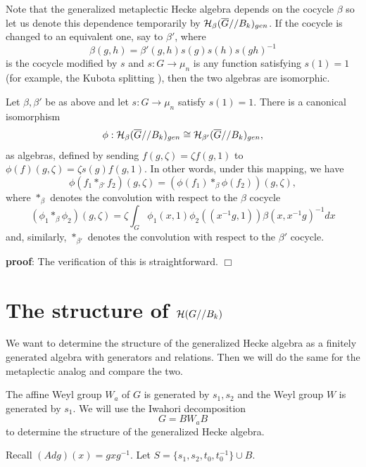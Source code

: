 Note that the generalized metaplectic Hecke
algebra depends on the cocycle $\beta$
so let us denote this dependence temporarily by
${\cal H}_\beta(\overline{G}//B_k)_{gen}$.
If the cocycle is changed to an equivalent one,
say to $\beta'$, where 
\[
\beta(g,h)=\beta'(g,h)s(g)s(h)s(gh)^{-1}
\]
is the cocycle modified by $s$ 
and $s:G\rightarrow \mu_n$ is any function
satisfying $s(1)=1$
(for example, the Kubota splitting
\cite{KP}), then the two algebras are 
isomorphic.

\begin{lemma} 
\label{lemma:isomorphic}
Let $\beta,\beta'$ be as above and let
$s:G\rightarrow \mu_n$ satisfy $s(1)=1$.
There is a canonical isomorphism
\[
\phi:{\cal H}_\beta(\overline{G}//B_k)_{gen}
\cong
{\cal H}_{\beta'}(\overline{G}//B_k)_{gen},
\]
as algebras, defined by sending $f(g,\zeta)=\zeta f(g,1)$ to
$\phi(f)(g,\zeta)=\zeta s(g) f(g,1)$. In other words,
under this mapping, we have
\[
\phi(f_1*_{\beta'} f_2)(g,\zeta)
=(\phi(f_1)*_{\beta}\phi(f_2))(g,\zeta),
\]
where $*_\beta$ denotes the convolution
with respect to the $\beta$ cocycle
\[
(\phi_1*_\beta \phi_2)(g,\zeta)
=\zeta \int_{G}\phi_1(x,1)\phi_2((x^{-1}g,1))
\beta(x,x^{-1}g)^{-1} dx
\]
and, similarly, $*_{\beta'}$ denotes the convolution
with respect to the $\beta'$ cocycle.
\end{lemma}

{\bf proof}: The verification of this
is straightforward.      $\Box$

\section{The structure of ${\cal H}(G//B_k)$}
\label{section:sl2}

We want to determine the structure of the generalized Hecke algebra as
a finitely generated algebra with generators and relations.
Then we will do the same for the metaplectic analog and compare the
two.

The affine Weyl group $W_a$ of $G$ is generated by $s_1,s_2$ and
the Weyl group $W$ is generated by $s_1$. We will use the
Iwahori decomposition
\[
G=BW_aB
\]
to determine the structure of the generalized Hecke algebra.

Recall $(Ad g)(x)=gxg^{-1}$. Let $S=\{s_1,s_2,t_0,
t_0^{-1}\}\cup B$.

